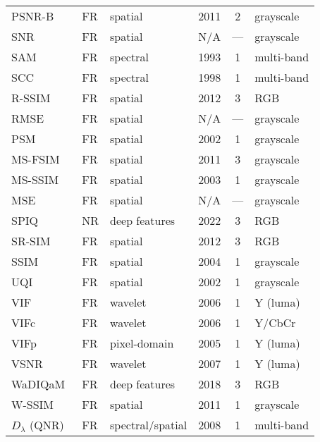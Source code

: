\begin{landscape}
\begin{longtable}{l l l c c l}
    PSNR-B~\cite{Yim2011PSNRB}                 & FR   & spatial             & 2011 & 2    & grayscale \\
    SNR~\cite{Gonzalez2008DIP}                 & FR   & spatial             & N/A  & ---  & grayscale \\
    SAM~\cite{Kruse1993SAM}                    & FR   & spectral            & 1993 & 1    & multi-band \\
    SCC~\cite{Zhou1998SCC}                     & FR   & spectral            & 1998 & 1    & multi-band \\
    R-SSIM~\cite{zhang2011fsim}                & FR   & spatial             & 2012 & 3    & RGB \\
    RMSE~\cite{Gonzalez2008DIP}                & FR   & spatial             & N/A  & ---  & grayscale \\
    PSM~\cite{Wang2002PQM}                     & FR   & spatial             & 2002 & 1    & grayscale \\
    MS-FSIM~\cite{Zhang2011FSIM}               & FR   & spatial             & 2011 & 3    & grayscale \\
    MS-SSIM~\cite{Wang2003MSSSIM}              & FR   & spatial             & 2003 & 1    & grayscale \\
    MSE~\cite{Gonzalez2008DIP}                 & FR   & spatial             & N/A  & ---  & grayscale \\
    SPIQ~\cite{Chen2022SPIQ}                   & NR   & deep features       & 2022 & 3    & RGB \\
    SR-SIM~\cite{Zhang2012SRSIM}               & FR   & spatial             & 2012 & 3    & RGB \\
    SSIM~\cite{Wang2004SSIM}                   & FR   & spatial             & 2004 & 1    & grayscale \\
    UQI~\cite{Wang2002UQI}                     & FR   & spatial             & 2002 & 1    & grayscale \\
    VIF~\cite{Sheikh2006VIF}                   & FR   & wavelet             & 2006 & 1    & Y (luma) \\
    VIFc~\cite{Sheikh2006VIF}                  & FR   & wavelet             & 2006 & 1    & Y/CbCr \\
    VIFp~\cite{Sheikh2005VIFp}                 & FR   & pixel-domain        & 2005 & 1    & Y (luma) \\
    VSNR~\cite{chandler2007vsnr}               & FR   & wavelet             & 2007 & 1    & Y (luma) \\
    WaDIQaM~\cite{Bosse2018WaDIQaM}            & FR   & deep features       & 2018 & 3    & RGB \\
    W-SSIM~\cite{Engelke2011WSSIM}             & FR   & spatial             & 2011 & 1    & grayscale \\
    $D_{\lambda}$ (QNR)~\cite{Alparone2008QNR} & FR   & spectral/spatial    & 2008 & 1    & multi-band \\
\end{longtable}
\end{landscape}

